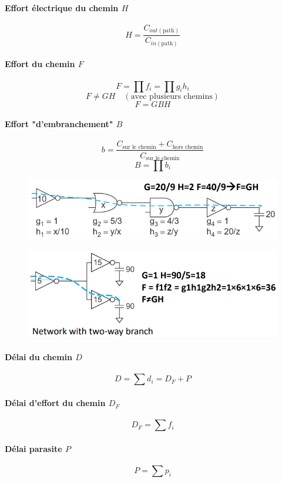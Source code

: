 \documentclass[resume]{subfiles}
\begin{document}
\begin{multicols}{3}
\paragraph{Effort électrique du chemin $H$}
$$H=\frac{C_{out(\text{path})}}{C_{in(\text{path})}}$$
\paragraph{Effort du chemin $F$}
$$F=\prod f_i=\prod g_ih_i$$
$$F\neq GH\quad (\text{avec plusieurs chemins})$$
$$\boxed{F=GBH}$$
\paragraph{Effort "d'embranchement" $B$}
$$b=\frac{C_{\text{sur le chemin}}+C_{\text{hors chemin}}}{C_{\text{sur le chemin}}}$$
$$B=\prod b_i$$
\begin{figure}[H]
\centering
\includegraphics[width=\columnwidth]{img_48.png}
\end{figure}

\begin{figure}[H]
\centering
\includegraphics[width=\columnwidth]{img_49.png}
\end{figure}
\paragraph{Délai du chemin $D$}
$$D=\sum d_i=D_F+P$$
\paragraph{Délai d'effort du chemin $D_F$}
$$D_F=\sum f_i$$
\paragraph{Délai parasite $P$}
$$P=\sum p_i$$

\end{multicols}
\end{document}
